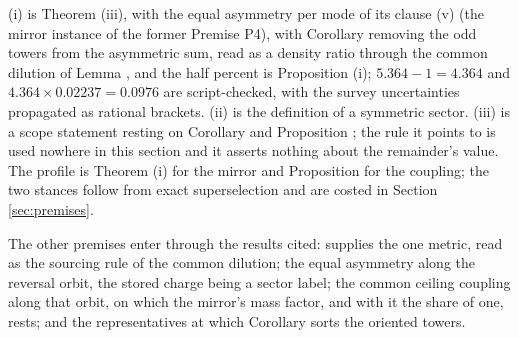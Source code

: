 (i) is Theorem (iii), with the equal asymmetry per mode of its clause (v) (the mirror instance of the former Premise P4), with Corollary  removing the odd towers from the asymmetric sum, read as a density ratio through the common dilution of Lemma , and the half percent is Proposition (i); $5.364 - 1 = 4.364$ and $4.364 \times 0.02237 = 0.0976$ are script-checked, with the survey uncertainties propagated as rational brackets. (ii) is the definition of a symmetric sector. (iii) is a scope statement resting on Corollary  and Proposition ; the rule it points to is used nowhere in this section and it asserts nothing about the remainder's value. The profile is Theorem (i) for the mirror and Proposition  for the coupling; the two stances follow from exact superselection and are costed in Section \ref{sec:premises}.

The other premises enter through the results cited:  supplies the one metric, read as the sourcing rule of the common dilution;  the equal asymmetry along the reversal orbit, the stored charge being a sector label;  the common ceiling coupling along that orbit, on which the mirror's mass factor, and with it the share of one, rests; and  the representatives at which Corollary  sorts the oriented towers.

